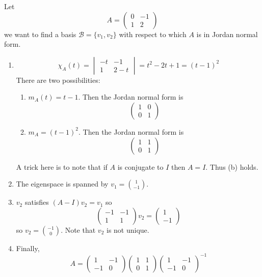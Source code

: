 \documentclass[a4paper]{article}
\newcommand*{\basis}{\mathcal}
\theoremstyle{definition}
\begin{document}
\begin{eg}
  Let
  \[
    A =
    \begin{pmatrix}
      0 & -1 \\
      1 & 2
    \end{pmatrix}
  \]
  we want to find a basis \(\basis B = \{v_1, v_2\}\) with respect to which \(A\) is in Jordan normal form.
  \begin{enumerate}
  \item
    \[
      \chi_A(t) =
      \begin{vmatrix}
        -t & -1 \\
        1 & 2 - t
      \end{vmatrix}
      = t^2 - 2t + 1 = (t - 1)^2
    \]
    There are two possibilities:
    \begin{enumerate}
    \item \(m_A(t) = t - 1\). Then the Jordan normal form is
      \[
        \begin{pmatrix}
          1 & 0 \\
          0 & 1
        \end{pmatrix}
      \]
    \item \(m_A = (t - 1)^2\). Then the Jordan normal form is
      \[
        \begin{pmatrix}
          1 & 1 \\
          0 & 1
        \end{pmatrix}
      \]
    \end{enumerate}
    A trick here is to note that if \(A\) is conjugate to \(I\) then \(A = I\). Thus (b) holds.
  \item The eigenspace is spanned by \(v_1 = \binom{1}{-1}\).
  \item \(v_2\) satisfies \((A - I)v_2 = v_1\) so
    \[
      \begin{pmatrix}
        -1 & -1 \\
        1 & 1
      \end{pmatrix}
      v_2 =
      \begin{pmatrix}
        1 \\
        -1
      \end{pmatrix}
    \]
    so \(v_2 = \binom{-1}{0}\). Note that \(v_2\) is not unique.
  \item Finally,
    \[
      A =
      \begin{pmatrix}
        1 & -1 \\
        -1 & 0
      \end{pmatrix}
      \begin{pmatrix}
        1 & 1 \\
        0 & 1
      \end{pmatrix}
      \begin{pmatrix}
        1 & -1 \\
        -1 & 0
      \end{pmatrix}
      ^{-1}
    \]
  \end{enumerate}
\end{eg}
\end{document}
